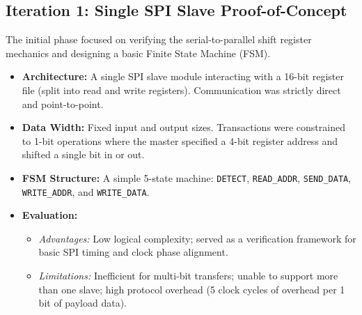 \documentclass[conference]{IEEEtran}
\begin{document}
\subsection{Iteration 1: Single SPI Slave Proof-of-Concept}
The initial phase focused on verifying the serial-to-parallel shift register mechanics and designing a basic Finite State Machine (FSM). 
\begin{itemize}
    \item \textbf{Architecture:} A single SPI slave module interacting with a 16-bit register file (split into read and write registers). Communication was strictly direct and point-to-point.
    \item \textbf{Data Width:} Fixed input and output sizes. Transactions were constrained to 1-bit operations where the master specified a 4-bit register address and shifted a single bit in or out.
    \item \textbf{FSM Structure:} A simple 5-state machine: \texttt{DETECT}, \texttt{READ\_ADDR}, \texttt{SEND\_DATA}, \texttt{WRITE\_ADDR}, and \texttt{WRITE\_DATA}.
    \item \textbf{Evaluation:} 
        \begin{itemize}
            \item \textit{Advantages:} Low logical complexity; served as a verification framework for basic SPI timing and clock phase alignment.
            \item \textit{Limitations:} Inefficient for multi-bit transfers; unable to support more than one slave; high protocol overhead (5 clock cycles of overhead per 1 bit of payload data).
        \end{itemize}
\end{itemize}
\end{document}
